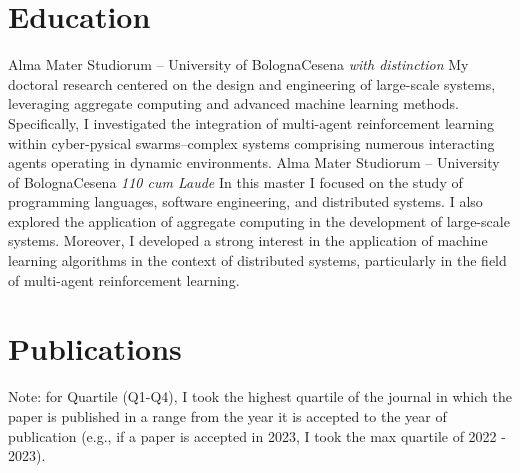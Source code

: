 \documentclass[10pt,a4paper,roman]{moderncv}        %
\begin{document}
\section{Education}

%
 {Alma Mater Studiorum -- University of Bologna}{Cesena}
 {\textit{with distinction}}{
My doctoral research centered on the design and engineering of large-scale systems, leveraging aggregate computing and advanced machine learning methods. Specifically, I investigated the integration of multi-agent reinforcement learning within cyber-pysical swarms--complex systems comprising numerous interacting agents operating in dynamic environments.
 }
%
 {Alma Mater Studiorum -- University of Bologna}{Cesena}
 {\textit{110 cum Laude}}{
  In this master I focused on the study of programming languages, software engineering, and distributed systems. I also explored the application of aggregate computing in the development of large-scale systems.
  Moreover, I developed a strong interest in the application of machine learning algorithms in the context of distributed systems, particularly in the field of multi-agent reinforcement learning.
 }


\section{Publications}
Note: for Quartile (Q1-Q4), I took the highest quartile of the journal in which the paper is published in a range from the year it is accepted to the year of publication (e.g., if a paper is accepted in 2023, I took the max quartile of 2022 - 2023).
\end{document}
